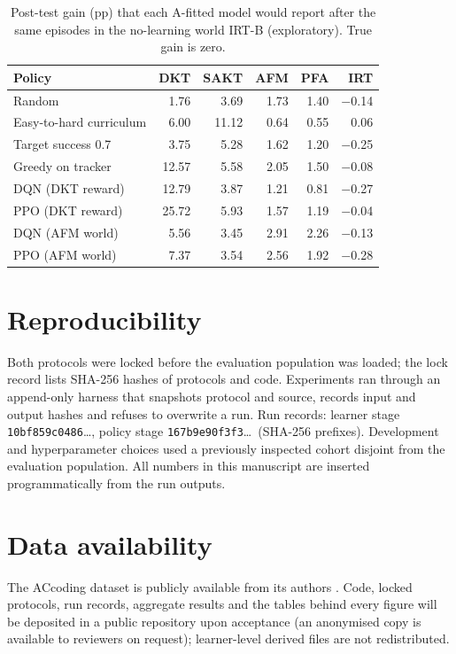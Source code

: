 \documentclass[a4paper,preprint,12pt,authoryear]{elsarticle}
\begin{document}
\begin{table}[H]
\centering
\caption{Post-test gain (pp) that each A-fitted model would report after the same episodes in the no-learning world IRT-B (exploratory). True gain is zero.}
\label{tab:observers}
\small
\begin{tabular}{lrrrrr}
\toprule
Policy & DKT & SAKT & AFM & PFA & IRT \\
\midrule
Random & 1.76 & 3.69 & 1.73 & 1.40 & $-$0.14 \\
Easy-to-hard curriculum & 6.00 & 11.12 & 0.64 & 0.55 & 0.06 \\
Target success 0.7 & 3.75 & 5.28 & 1.62 & 1.20 & $-$0.25 \\
Greedy on tracker & 12.57 & 5.58 & 2.05 & 1.50 & $-$0.08 \\
DQN (DKT reward) & 12.79 & 3.87 & 1.21 & 0.81 & $-$0.27 \\
PPO (DKT reward) & 25.72 & 5.93 & 1.57 & 1.19 & $-$0.04 \\
DQN (AFM world) & 5.56 & 3.45 & 2.91 & 2.26 & $-$0.13 \\
PPO (AFM world) & 7.37 & 3.54 & 2.56 & 1.92 & $-$0.28 \\
\bottomrule
\end{tabular}
\end{table}

\section{Reproducibility}\label{app:repro}

Both protocols were locked before the evaluation population was loaded; the lock record lists SHA-256 hashes of protocols and code. Experiments ran through an append-only harness that snapshots protocol and source, records input and output hashes and refuses to overwrite a run. Run records: learner stage \texttt{10bf859c0486}\ldots, policy stage \texttt{167b9e90f3f3}\ldots\ (SHA-256 prefixes). Development and hyperparameter choices used a previously inspected cohort disjoint from the evaluation population. All numbers in this manuscript are inserted programmatically from the run outputs.

\section*{Data availability}
The ACcoding dataset is publicly available from its authors \citep{sun2026accodingdata,chen2024accoding}. Code, locked protocols, run records, aggregate results and the tables behind every figure will be deposited in a public repository upon acceptance (an anonymised copy is available to reviewers on request); learner-level derived files are not redistributed.
\end{document}
